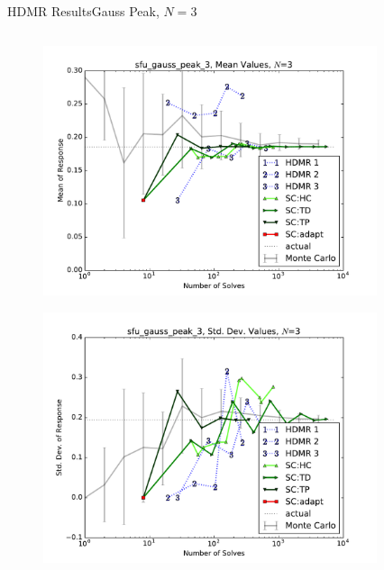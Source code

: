 \documentclass{beamer}
\begin{document}
\begin{frame}{HDMR Results}{Gauss Peak, $N=3$}\vspace{-20pt}
 \begin{columns}
   \begin{column}{0.5\textwidth}
        \begin{figure}[h!]
          \centering
          \includegraphics[width=0.8\linewidth]{anlmodels/sfu_gauss_peak_3_mean_vals}
        \end{figure}
        \vspace{-20pt}
        \begin{figure}[h!]
          \centering
          \includegraphics[width=0.8\linewidth]{anlmodels/sfu_gauss_peak_3_var_vals}
        \end{figure}
   \end{column}
   \begin{column}{0.5\textwidth}
        \begin{figure}[h!]
          \centering

\end{figure}
\end{column}
\end{columns}
\end{frame}
\end{document}
